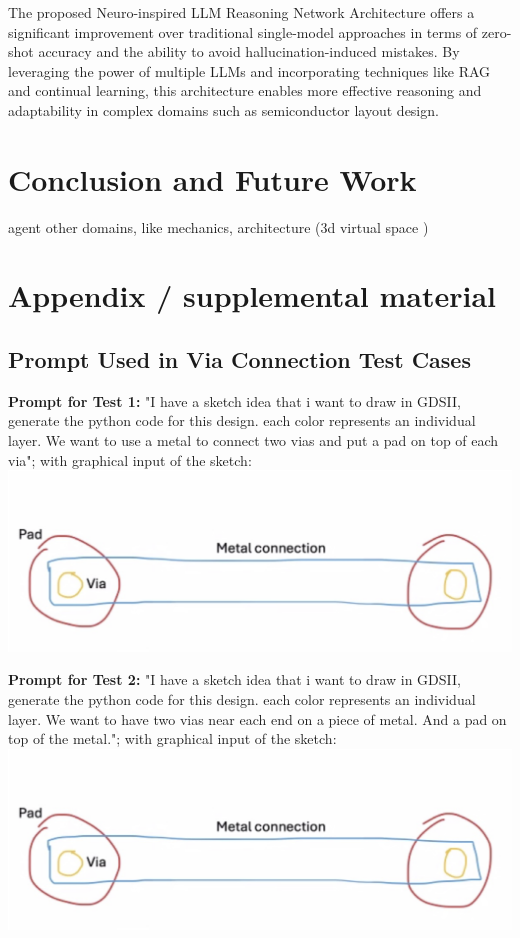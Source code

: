 \documentclass{article}
\begin{document}
The proposed Neuro-inspired LLM Reasoning Network Architecture offers a significant improvement over traditional single-model approaches in terms of zero-shot accuracy and the ability to avoid hallucination-induced mistakes. By leveraging the power of multiple LLMs and incorporating techniques like RAG and continual learning, this architecture enables more effective reasoning and adaptability in complex domains such as semiconductor layout design.

\section{Conclusion and Future Work}
agent \cite{Ho2024-cd}
other domains, like mechanics, architecture (3d virtual space \cite{Sasazawa2024-wf})

\printbibliography %

\newpage
\appendix

\section{Appendix / supplemental material}
\subsection{Prompt Used in Via Connection Test Cases}
\textbf{Prompt for Test 1:}
"I have a sketch idea that i want to draw in GDSII, generate the python code for this design. each color represents an individual layer. We want to use a metal to connect two vias and put a pad on top of each via"; with graphical input of the sketch:
\includegraphics[width=0.5\linewidth]{sketch.png}

\textbf{Prompt for Test 2:} "I have a sketch idea that i want to draw in GDSII, generate the python code for this design. each color represents an individual layer. We want to have two vias near each end on a piece of metal. And a pad on top of the metal."; with graphical input of the sketch:
\includegraphics[width=0.5\linewidth]{sketch.png}
\end{document}
